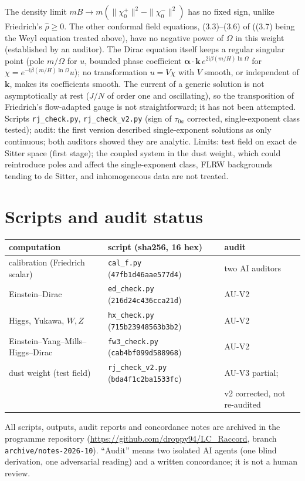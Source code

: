 \documentclass[11pt,a4paper]{article}
\newcommand{\ii}{\mathrm{i}}
\begin{document}
The density limit $mB\to m(\|\chi_{0}^{+}\|^{2}-\|\chi_{0}^{-}\|^{2})$ has no fixed sign, unlike Friedrich's $\hat\rho\ge0$. The other conformal field equations, (3.3)--(3.6) of \cite{Friedrich2017} ((3.7) being the Weyl equation treated above), have no negative power of $\Omega$ in this weight (established by an auditor). The Dirac equation itself keeps a regular singular point (pole $m/\Omega$ for $u$, bounded phase coefficient $\boldsymbol\alpha\cdot\mathbf{k}\,e^{2\ii\beta(m/H)\ln\Omega}$ for $\chi=e^{-\ii\beta(m/H)\ln\Omega}u$); no transformation $u=V\chi$ with $V$ smooth, or independent of $\mathbf{k}$, makes its coefficients smooth. The current of a generic solution is not asymptotically at rest ($J/N$ of order one and oscillating), so the transposition of Friedrich's flow-adapted gauge is not straightforward; it has not been attempted. Scripts \texttt{rj\_check.py}, \texttt{rj\_check\_v2.py} (sign of $\tau_{0a}$ corrected, single-exponent class tested); audit: the first version described single-exponent solutions as only continuous; both auditors showed they are analytic. Limits: test field on exact de Sitter space (first stage); the coupled system in the dust weight, which could reintroduce poles and affect the single-exponent class, FLRW backgrounds tending to de Sitter, and inhomogeneous data are not treated.

\section{Scripts and audit status}
\begin{center}\footnotesize
\begin{tabular}{lll}
\toprule
computation & script (sha256, 16 hex) & audit\\
\midrule
calibration (Friedrich scalar) & \texttt{cal\_f.py} (\texttt{47fb1d46aae577d4}) & two AI auditors\\
Einstein--Dirac & \texttt{ed\_check.py} (\texttt{216d24c436cca21d}) & AU-V2\\
Higgs, Yukawa, $W,Z$ & \texttt{hx\_check.py} (\texttt{715b23948563b3b2}) & AU-V2\\
Einstein--Yang--Mills--Higgs--Dirac & \texttt{fw3\_check.py} (\texttt{cab4bf099d588968}) & AU-V2\\
dust weight (test field) & \texttt{rj\_check\_v2.py} (\texttt{bda4f1c2ba1533fc}) & AU-V3 partial;\\
 & & v2 corrected, not re-audited\\
\bottomrule
\end{tabular}
\end{center}
All scripts, outputs, audit reports and concordance notes are archived in the programme repository (\url{https://github.com/droppy94/LC_Raccord}, branch \texttt{archive/notes-2026-10}). ``Audit'' means two isolated AI agents (one blind derivation, one adversarial reading) and a written concordance; it is not a human review.
\end{document}

